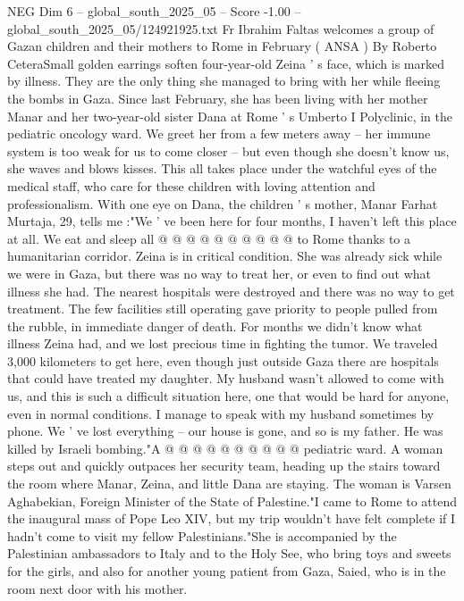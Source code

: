 \begin{textsample}{NEG Dim 6 – global\_south\_2025\_05 – Score -1.00 – global\_south\_2025\_05/124921925.txt}  \label{ex:f6_neg_417}
Fr Ibrahim Faltas welcomes a group of Gazan children and their mothers to Rome in February ( ANSA ) By Roberto CeteraSmall golden earrings soften four-year-old Zeina ' s face, which is marked by illness.
They are the only thing she managed to bring with her while fleeing the bombs in Gaza.
Since last February, she has been living with her mother Manar and her two-year-old sister Dana at Rome ' s Umberto I Polyclinic, in the pediatric oncology ward.
We greet her from a few meters away -- her immune system is too weak for us to come closer -- but even though she doesn't know us, she waves and blows kisses.
This all takes place under the watchful eyes of the medical staff, who care for these children with loving attention and professionalism.
With one eye on Dana, the children ' s mother, Manar Farhat Murtaja, 29, tells me :"We ' ve been here for four months, I haven't left this place at all.
We eat and sleep all @ @ @ @ @ @ @ @ @ @ to Rome thanks to a humanitarian corridor.
Zeina is in critical condition.
She was already sick while we were in Gaza, but there was no way to treat her, or even to find out what illness she had.
The nearest hospitals were destroyed and there was no way to get treatment.
The few facilities still operating gave priority to people pulled from the rubble, in immediate danger of death.
For months we didn't know what illness Zeina had, and we lost precious time in fighting the tumor.
We traveled 3,000 kilometers to get here, even though just outside Gaza there are hospitals that could have treated my daughter.
My husband wasn't allowed to come with us, and this is such a difficult situation here, one that would be hard for anyone, even in normal conditions.
I manage to speak with my husband sometimes by phone.
We ' ve lost everything -- our house is gone, and so is my father.
He was killed by Israeli bombing."A @ @ @ @ @ @ @ @ @ @ pediatric ward.
A woman steps out and quickly outpaces her security team, heading up the stairs toward the room where Manar, Zeina, and little Dana are staying.
The woman is Varsen Aghabekian, Foreign Minister of the State of Palestine."I came to Rome to attend the inaugural mass of Pope Leo XIV, but my trip wouldn't have felt complete if I hadn't come to visit my fellow Palestinians."She is accompanied by the Palestinian ambassadors to Italy and to the Holy See, who bring toys and sweets for the girls, and also for another young patient from Gaza, Saied, who is in the room next door with his mother.

\end{textsample}
